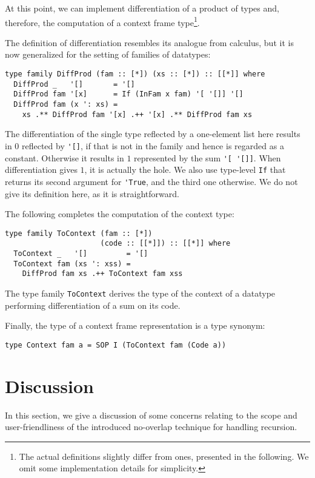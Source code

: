 \documentclass[runningheads]{llncs}
\newcommand{\K}[1]{\lstinline[style=fancy]{#1}}
\begin{document}
At this point, we can implement differentiation of a product of types and, therefore, the computation of a context frame type\footnote{The actual definitions slightly differ from ones, presented in the following. We omit some implementation details for simplicity.}. 

The definition of differentiation resembles its analogue from calculus, but it is now generalized for the setting of families of datatypes:
\begin{lstlisting}[style=fancy]
type family DiffProd (fam :: [*]) (xs :: [*]) :: [[*]] where
  DiffProd _   '[]       = '[]
  DiffProd fam '[x]      = If (InFam x fam) '[ '[]] '[]
  DiffProd fam (x ': xs) =
    xs .** DiffProd fam '[x] .++ '[x] .** DiffProd fam xs
\end{lstlisting}
The differentiation of the single type reflected by a one-element list here results in $0$ reflected by \K{'[]}, if that is not in the family and hence is regarded as a constant. Otherwise it results in $1$ represented by the sum \K{'[ '[]]}. When differentiation gives $1$, it is actually the hole. We also use type-level \K{If} that returns its second argument for \K{'True}, and the third one otherwise. We do not give its definition here, as it is straightforward.

The following completes the computation of the context type:
\begin{lstlisting}[style=fancy]
type family ToContext (fam :: [*])
                      (code :: [[*]]) :: [[*]] where
  ToContext _   '[]         = '[]
  ToContext fam (xs ': xss) =
    DiffProd fam xs .++ ToContext fam xss
\end{lstlisting}
The type family \K{ToContext} derives the type of the context of a datatype performing differentiation of a sum on its code.

Finally, the type of a context frame representation is a type synonym:
\begin{lstlisting}[style=fancy]
type Context fam a = SOP I (ToContext fam (Code a))
\end{lstlisting}


\section{Discussion}
\label{sec:discussion}

In this section, we give a discussion of some concerns relating to the scope and user-friendliness of the introduced no-overlap technique for handling recursion.
\end{document}
